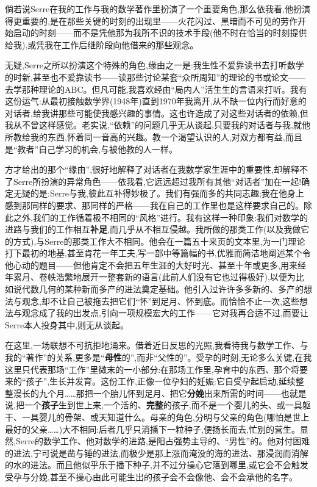 倘若说Serre在我的工作与我的数学著作里扮演了一个重要角色,那么依我看,他扮演得更重要的,是在那些关键的时刻的出现里——火花闪过、黑暗而不可见的劳作开始启动的时刻——而不是凭他那为我所不识的技术手段(他不时在恰当的时刻提供给我),或凭我在工作后继阶段向他借来的那些观念。

无疑,Serre之所以扮演这个特殊的角色,缘由之一是:我生性不爱靠读书去打听数学的时新,甚至也不爱靠读书——读那些讨论某套“众所周知”的理论的书或论文——去学那种理论的ABC。但凡可能,我喜欢经由“局内人”活生生的言语来打听。我有这份运气:从最初接触数学界(1948年)直到1970年我离开,从不缺一位内行而好意的对话者,给我讲那些可能使我感兴趣的事情。这也许造成了对这些对话者的依赖,但我从不曾这样感觉。老实说,“依赖”的问题几乎无从谈起,只要我的对话者与我,就他所教给我的东西,怀着同一音高的兴趣。教一个渴望认识的人,对双方都有益,而且是“教者”自己学习的机会,与被他教的人一样。

方才给出的那个“缘由”,很好地解释了对话者在我数学家生涯中的重要性,却解释不了Serre所扮演的异常角色——依我看,它远远超过我所有其他“对话者”加在一起!确定无疑的是:Serre与我,彼此互补得妙极了。我们有强而多的共同志趣;我在他身上感到那同样的要求、那同样的严格——我在自己的工作里也是这样要求自己的。除此之外,我们的工作循着极不相同的“风格”进行。我有这样一种印象:我们对数学的进路\dmark{}与我们的工作相互\textbf{补足},而几乎从不相互侵越。我所做的那类工作(以及我做它的方式),与Serre的那类工作大不相同。他会在一篇五十来页的文本里,为一门理论打下最初的地基,甚至肯花一年工夫,写一部中等篇幅的书,优雅而简洁地阐述某个令他心动的题目——但他肯定不会把五年生涯的大好时光、甚至十年或更多,用来经年累月、卷帙浩繁地展开一整套新的语言(此前人们没有它也过得极好),以便为比如说代数几何的某种新而多产的进法奠定基础。他引入过许许多多新的、多产的想法与观念,却不让自己被拖去把它们“怀”到足月、怀到底。而恰恰不止一次,这些想法与观念成了我的出发点,引向一项规模宏大的工作——它对我再合适不过,而要让Serre本人投身其中,则无从谈起。

在这里,一场联想不可抗拒地涌来。借着近日反思的光照,我看待我与数学工作、与我的“著作”的关系,更多是“\textbf{母性}的”,而非“父性的”。受孕的时刻,无论多么关键,在我这里只代表那场“工作”里微末的一小部分:在那场工作里,孕育中的东西、那个将要来的“孩子”,生长并发育。这份工作,正像一位孕妇的妊娠:它自受孕起启动,延续整整漫长的九个月……那把一个胎儿怀到足月、把它\textbf{分娩}出来所需的时间——也就是说,把一个\textbf{孩子}生到世上来,一个活的、\textbf{完整}的孩子,而不是一个婴儿的头、或一具躯干、一具婴儿的骨架、或天知道什么。母亲的角色,分明与父亲的角色(哪怕是世上最好的父亲……)大不相同:后者几乎只消播下一粒种子,便扬长而去,忙别的营生。显然,Serre的数学工作、他对数学的进路,是阳占强势主导的、“男性”的。他对付困难的进法,宁可说是凿与锤的进法,而极少是那上涨而淹没的海的进法、那浸润而消解的水的进法。而且他似乎乐于播下种子,并不过分操心它落到哪里,或它会不会触发受孕与分娩,甚至不操心由此可能生出的孩子会不会像他、会不会承他的名字。

